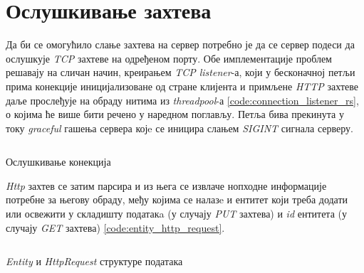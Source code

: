 \section{Ослушкивање захтева}

Да би се омогућило слање захтева на сервер потребно је да се сервер подеси да ослушкује \textit{TCP} захтеве на одређеном порту. Обе имплементације проблем решавају на сличан начин, креирањем \textit{TCP listener}-а, који у бесконачној петљи прима конекције иницијализоване од стране клијента и примљене \textit{HTTP} захтеве даље прослеђује на обраду нитима из \textit{threadpool}-а \ref{code:connection_listener_rs}, о којима ће више бити речено у наредном поглављу. Петља бива прекинута у току \textit{graceful} гашења сервера којe се иницира слањем \textit{SIGINT} сигнала серверу.\\

\begin{listing}[H]
\inputminted{rust}{kodovi/connection_listener.rs}
\caption{Ослушкивање конекција}
\label{code:connection_listener_rs}
\end{listing}

\textit{Http} захтев се затим парсира и из њега се извлаче нопходне информације потребне за његову обраду, међу којима се налазe  и ентитет који треба додати или освежити у складишту податакa (у случају \textit{PUT} захтева) и \textit{id} ентитета (у случају \textit{GET} захтева) \ref{code:entity_http_request}.

\begin{listing}[H]
\inputminted{rust}{kodovi/entity_http_request.rs}
\caption{\textit{Entity} и \textit{HttpRequest} структуре података}
\label{code:entity_http_request}
\end{listing}